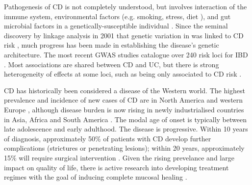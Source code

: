 Pathogenesis of \gls{CD} is not completely understood, but involves interaction of the immune system, environmental factors (e.g. smoking, stress, diet \autocite{ananthakrishnan2015EpidemiologyRiskFactors,roda2020CrohnDisease}), and gut microbial factors in a genetically-susceptible individual \autocite{desouza2016ImmunopathogenesisIBDCurrent}.
Since the seminal discovery by linkage analysis in 2001 that genetic variation in  was linked to \gls{CD} risk \autocite{todd2001TacklingCommonDisease},
much progress has been made in establishing the disease's genetic architecture.
The most recent \gls{GWAS} studies catalogue over 240 risk loci for \gls{IBD} \autocite{delange2017GenomewideAssociationStudy}.
Most associations are shared between \gls{CD} and \gls{UC}, but there is strong heterogeneity of effects at some loci, such as  being only associated to \gls{CD} risk \autocite{jostins2012HostMicrobeInteractions,liu2015AssociationAnalysesIdentify}.

\gls{CD} has historically been considered a disease of the Western world.
The highest prevalence and incidence of new cases of \gls{CD} are in North America and western Europe \autocite{roda2020CrohnDisease},
although disease burden is now rising in newly industrialised countries in Asia, Africa and South America \autocite{kaplan2015GlobalBurdenIBD,alatab2020GlobalRegionalNational}.
The modal age of onset is typically between late adolescence and early adulthood.
The disease is progressive.
Within 10 years of diagnosis, approximately 50\% of patients with CD develop further complications (strictures or penetrating lesions); within 20 years, approximately 15\% will require surgical intervention \autocite{roda2020CrohnDisease}.
Given the rising prevelance and large impact on quality of life, there is active research into developing treatment regimes with the goal of inducing complete mucosal healing \autocite{levin2016MechanismActionAntiTNF,roda2020CrohnDisease}.


